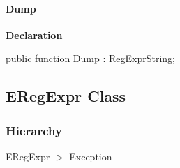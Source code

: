 \documentclass{report}
\newif\ifpdf
\begin{document}
\paragraph*{Dump}\hspace*{\fill}

\label{RegExpr.TRegExpr-Dump}
\begin{list}{}{
\setlength{\itemindent}{0cm}
\setlength{\listparindent}{0cm}
\setlength{\leftmargin}{\evensidemargin}
\addtolength{\leftmargin}{\tmplength}
\settowidth{\labelsep}{X}
\addtolength{\leftmargin}{\labelsep}
\setlength{\labelwidth}{\tmplength}
}
\item[\textbf{Declaration}\hfill]
\ifpdf
\begin{flushleft}
\fi
\begin{ttfamily}
public function Dump : RegExprString;\end{ttfamily}

\ifpdf
\end{flushleft}
\fi

\end{list}
\ifpdf
\subsection*{\large{\textbf{ERegExpr Class}}\normalsize\hspace{1ex}\hrulefill}
\else
\subsection*{ERegExpr Class}
\fi
\label{RegExpr.ERegExpr}
\subsubsection*{\large{\textbf{Hierarchy}}\normalsize\hspace{1ex}\hfill}
ERegExpr {$>$} Exception
\end{document}
